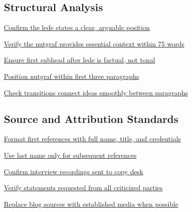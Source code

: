 \documentclass[12pt]{article}
\begin{document}
\subsection{Structural Analysis}

\begin{Form}
\noindent\CheckBox[name=lede-assessment,width=1em,height=1em]{} \hyperref[sec:lede-assessment]{\textcolor{atlantic}{Confirm the lede states a clear, arguable position}}

\vspace{0.3em}
\noindent\CheckBox[name=nutgraf-check,width=1em,height=1em]{} \hyperref[sec:nutgraf-check]{\textcolor{atlantic}{Verify the nutgraf provides essential context within 75 words}}

\vspace{0.3em}
\noindent\CheckBox[name=subhead-placement-check,width=1em,height=1em]{} \hyperref[sec:subhead-placement]{\textcolor{atlantic}{Ensure first subhead after lede is factual, not tonal}}

\vspace{0.3em}
\noindent\CheckBox[name=nutgraf-placement-check,width=1em,height=1em]{} \hyperref[sec:nutgraf-placement]{\textcolor{atlantic}{Position nutgraf within first three paragraphs}}

\vspace{0.3em}
\noindent\CheckBox[name=transition-flow-check,width=1em,height=1em]{} \hyperref[sec:transition-flow]{\textcolor{atlantic}{Check transitions connect ideas smoothly between paragraphs}}
\end{Form}

\subsection{Source and Attribution Standards}

\begin{Form}
\noindent\CheckBox[name=attribution-format,width=1em,height=1em]{} \hyperref[sec:attribution-format]{\textcolor{atlantic}{Format first references with full name, title, and credentials}}

\vspace{0.3em}
\noindent\CheckBox[name=subsequent-references,width=1em,height=1em]{} \hyperref[sec:subsequent-references]{\textcolor{atlantic}{Use last name only for subsequent references}}

\vspace{0.3em}
\noindent\CheckBox[name=interview-verification,width=1em,height=1em]{} \hyperref[sec:interview-verification]{\textcolor{atlantic}{Confirm interview recordings sent to copy desk}}

\vspace{0.3em}
\noindent\CheckBox[name=statement-requests,width=1em,height=1em]{} \hyperref[sec:statement-requests]{\textcolor{atlantic}{Verify statements requested from all criticized parties}}

\vspace{0.3em}
\noindent\CheckBox[name=source-quality,width=1em,height=1em]{} \hyperref[sec:source-quality]{\textcolor{atlantic}{Replace blog sources with established media when possible}}
\end{Form}
\end{document}
